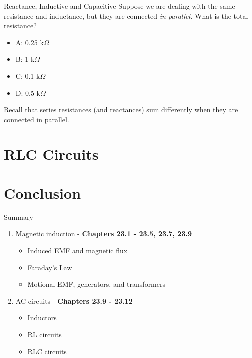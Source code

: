 \documentclass{beamer}
\begin{document}
\begin{frame}{Reactance, Inductive and Capacitive}
Suppose we are dealing with the same resistance and inductance, but they are connected \textit{in parallel.}  What is the total resistance?
\begin{itemize}
\item A: 0.25 k$\Omega$
\item B: 1 k$\Omega$
\item C: 0.1 k$\Omega$
\item D: 0.5 k$\Omega$
\end{itemize}
\footnotesize
Recall that series resistances (and reactances) sum differently when they are connected in parallel.
\end{frame}

\section{RLC Circuits}

\section{Conclusion}

\begin{frame}{Summary}
\begin{enumerate}
\item Magnetic induction - \textbf{Chapters 23.1 - 23.5, 23.7, 23.9}
\begin{itemize}
\item Induced EMF and magnetic flux
\item Faraday's Law
\item Motional EMF, generators, and transformers
\end{itemize}
\item AC circuits - \textbf{Chapters 23.9 - 23.12}
\begin{itemize}
\item Inductors
\item RL circuits
\item RLC circuits
\end{itemize}
\end{enumerate}
\end{frame}
\end{document}
